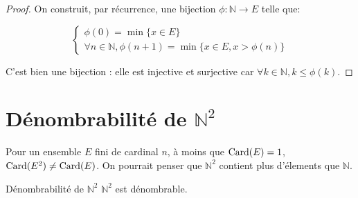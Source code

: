 \documentclass[a4paper,french,final]{memoir}
\begin{document}
\begin{proof}
	On construit, par récurrence, une bijection $\phi : \mathbb{N} \to E$ telle que: 
	
	\[\left\lbrace \begin{array}{c}
	\phi(0) = \min \{x \in E\} \\
	\forall n \in \mathbb{N}, \phi(n+1) = \min \{x \in E, x > \phi(n) \}
	\end{array} \right.\]
	
	C'est bien une bijection : elle est injective et surjective car $\forall k \in \mathbb{N}, k \leq \phi(k)$. 
\end{proof}

\section{\texorpdfstring{Dénombrabilité de $\mathbb{N}^2$}{Dénombrabilité de N²}}

Pour un ensemble $E$ fini de cardinal $n$, à moins que $\operatorname{Card}(E) = 1$, $\operatorname{Card}(E^2) \neq \operatorname{Card}(E)$. On pourrait penser que $\mathbb{N}^2 $ contient plus d'élements que $\mathbb{N}$. 

\begin{theoremb}{Dénombrabilité de $\mathbb{N}^2$}{}
	$\mathbb{N}^2$ est dénombrable. 
\end{theoremb}
\end{document}
